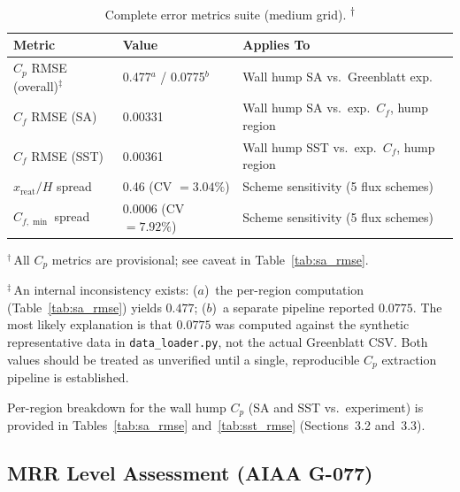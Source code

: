 \documentclass[11pt,a4paper]{article}
\begin{document}
\begin{table}[!ht]
\centering
\caption{Complete error metrics suite (medium grid).%
  \textsuperscript{$\dagger$}}
\label{tab:error_summary}
\begin{tabular}{llp{6cm}}
\toprule
\textbf{Metric} & \textbf{Value} & \textbf{Applies To} \\
\midrule
$C_p$ RMSE (overall)$^\ddagger$  & 0.477$^a$ / 0.0775$^b$  & Wall hump SA vs.\ Greenblatt exp. \\
$C_f$ RMSE (SA)  & 0.00331 & Wall hump SA vs.\ exp.\ $C_f$, hump region \\
$C_f$ RMSE (SST) & 0.00361 & Wall hump SST vs.\ exp.\ $C_f$, hump region \\
$x_\text{reat}/H$ spread & 0.46 (CV $= 3.04\%$) & Scheme sensitivity (5 flux schemes) \\
$C_{f,\min}$ spread & 0.0006 (CV $= 7.92\%$) & Scheme sensitivity (5 flux schemes) \\
\bottomrule
\end{tabular}

\medskip\footnotesize
$^\dagger$\,All $C_p$ metrics are provisional; see caveat in
Table~\ref{tab:sa_rmse}.

$^\ddagger$\,An internal inconsistency exists: ($a$)~the per-region
computation (Table~\ref{tab:sa_rmse}) yields $0.477$; ($b$)~a separate
pipeline reported $0.0775$.  The most likely explanation is that $0.0775$
was computed against the synthetic representative data in
\texttt{data\_loader.py}, not the actual Greenblatt CSV.
Both values should be treated as unverified until a single,
reproducible $C_p$ extraction pipeline is established.
\end{table}

Per-region breakdown for the wall hump $C_p$ (SA and SST vs.\ experiment)
is provided in Tables~\ref{tab:sa_rmse} and~\ref{tab:sst_rmse}
(Sections~3.2 and~3.3).

\subsection{MRR Level Assessment (AIAA G-077)}
\end{document}
